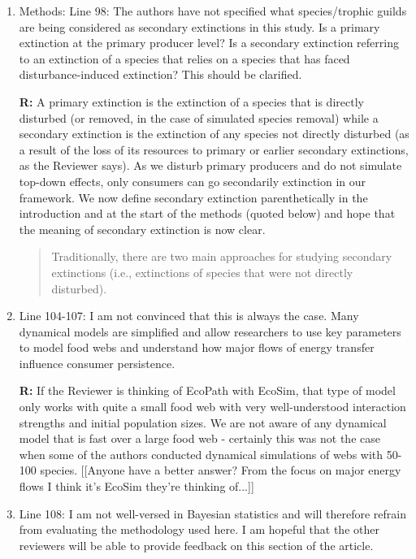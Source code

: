 \documentclass[12pt]{article}
\begin{document}
\begin{enumerate}
            \item Methods: Line 98: The authors have not specified what species/trophic guilds are being considered as secondary extinctions in this study. Is a primary extinction at the primary producer level? Is a secondary extinction referring to an extinction of a species that relies on a species that has faced disturbance-induced extinction? This should be clarified.

                \textbf{R:} A primary extinction is the extinction of a species that is directly disturbed (or removed, in the case of simulated species removal) while a secondary extinction is the extinction of any species not directly disturbed (as a result of the loss of its resources to primary or earlier secondary extinctions, as the Reviewer says). As we disturb primary producers and do not simulate top-down effects, only consumers can go secondarily extinction in our framework. We now define secondary extinction parenthetically in the introduction and at the start of the methods (quoted below) and hope that the meaning of secondary extinction is now clear.

                \begin{quotation} 
                Traditionally, there are two main approaches for studying secondary extinctions (i.e., extinctions of species that were not directly disturbed). 
                \end{quotation}

            \item Line 104-107: I am not convinced that this is always the case. Many dynamical models are simplified and allow researchers to use key parameters to model food webs and understand how major flows of energy transfer influence consumer persistence.

                \textbf{R:} If the Reviewer is thinking of EcoPath with EcoSim, that type of model only works with quite a small food web with very well-understood interaction strengths and initial population sizes. We are not aware of any dynamical model that is fast over a large food web - certainly this was not the case when some of the authors conducted dynamical simulations of webs with 50-100 species. [[Anyone have a better answer? From the focus on major energy flows I think it's EcoSim they're thinking of...]]


            \item Line 108: I am not well-versed in Bayesian statistics and will therefore refrain from evaluating the methodology used here. I am hopeful that the other reviewers will be able to provide feedback on this section of the article.


\end{enumerate}
\end{document}
